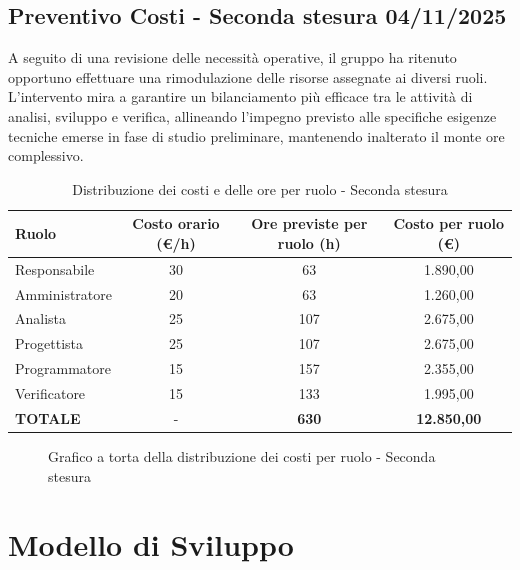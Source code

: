\documentclass[a4paper, 11pt, oneside]{scrartcl} %
\begin{document}
\newpage
\subsection{Preventivo Costi - Seconda stesura 04/11/2025}
\label{sec:preventivo_v2}
A seguito di una revisione delle necessità operative, il gruppo ha ritenuto opportuno effettuare una rimodulazione delle risorse assegnate ai diversi ruoli.
L'intervento mira a garantire un bilanciamento più efficace tra le attività di analisi, sviluppo e verifica, allineando l'impegno previsto alle specifiche esigenze tecniche emerse in fase di studio preliminare, mantenendo inalterato il monte ore complessivo.
\begin{table}[!ht]
\centering
\renewcommand{\arraystretch}{1.4}
\begin{tabularx}{\textwidth}{L c c c}
\toprule
\textbf{Ruolo} & \textbf{Costo orario (€/h)} & \textbf{Ore previste per ruolo (h)} & \textbf{Costo per ruolo (€)} \\
\midrule
Responsabile & 30 & 63 & 1.890,00 \\
Amministratore & 20 & 63 & 1.260,00 \\
Analista & 25 & 107 & 2.675,00 \\
Progettista & 25 & 107 & 2.675,00 \\
Programmatore & 15 & 157 & 2.355,00 \\
Verificatore & 15 & 133 & 1.995,00 \\
\midrule
\textbf{TOTALE} & - & \textbf{630} & \textbf{12.850,00} \\
\bottomrule
\end{tabularx}
\caption{Distribuzione dei costi e delle ore per ruolo - Seconda stesura}
\label{tab_fig_distribuzione_dei_costi_e_dell}
\end{table}

\begin{figure}[!ht]
\centering
{}
\caption{Grafico a torta della distribuzione dei costi per ruolo - Seconda stesura}
\label{tab_fig_grafico_a_torta_della_distribu}
\end{figure}

\newpage
\section{Modello di Sviluppo}
\end{document}
